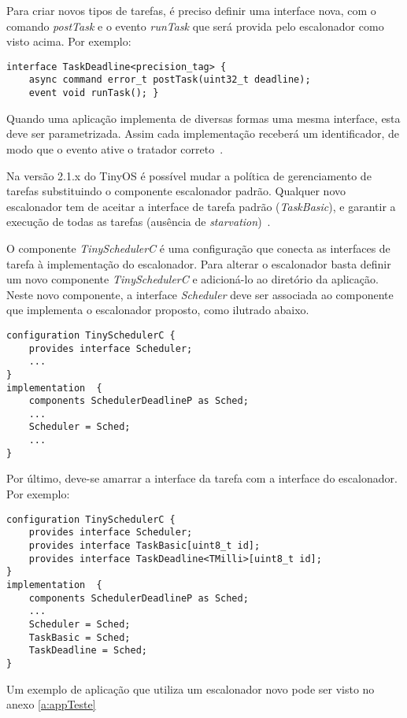 Para criar novos tipos de tarefas, é preciso
definir uma interface nova, com o comando \textit{postTask} e o evento
\textit{runTask} que será provida pelo escalonador como visto acima. Por exemplo:
\begin{lstlisting}
interface TaskDeadline<precision_tag> { 
    async command error_t postTask(uint32_t deadline);
    event void runTask(); }
\end{lstlisting}

Quando uma aplicação implementa de diversas formas uma mesma interface, esta deve ser parametrizada. Assim cada
implementação receberá um identificador, de modo que o evento ative o tratador correto~\cite[s. 8.3 e 9]{LevisGay/09}.

Na versão 2.1.x do TinyOS é possível mudar a política de gerenciamento de tarefas substituindo 
o componente escalonador padrão. Qualquer novo escalonador tem de
aceitar a interface de tarefa padrão (\textit{TaskBasic}), e garantir a execução de todas as tarefas 
(ausência de {\em starvation})~\cite{TEP106}.

O componente \textit{TinySchedulerC} é uma configuração que conecta as interfaces de tarefa à implementação do
escalonador.
Para alterar o escalonador basta definir um novo componente \textit{TinySchedulerC} e adicioná-lo ao diretório da
aplicação. Neste novo componente, a interface \textit{Scheduler} deve ser associada ao componente que implementa o
escalonador proposto, como ilutrado abaixo.
\begin{lstlisting}
configuration TinySchedulerC {
    provides interface Scheduler;
    ...
}
implementation  {
    components SchedulerDeadlineP as Sched;
    ...
    Scheduler = Sched; 
    ...
}
\end{lstlisting}


Por último, deve-se amarrar a interface da tarefa com a interface do escalonador. Por exemplo:
\begin{lstlisting}
configuration TinySchedulerC {
    provides interface Scheduler;
    provides interface TaskBasic[uint8_t id];
    provides interface TaskDeadline<TMilli>[uint8_t id];
}
implementation  {
    components SchedulerDeadlineP as Sched;
    ...
    Scheduler = Sched;
    TaskBasic = Sched; 
    TaskDeadline = Sched;
}
\end{lstlisting}

Um exemplo de aplicação que utiliza um escalonador novo pode ser visto no anexo \ref{a:appTeste}


